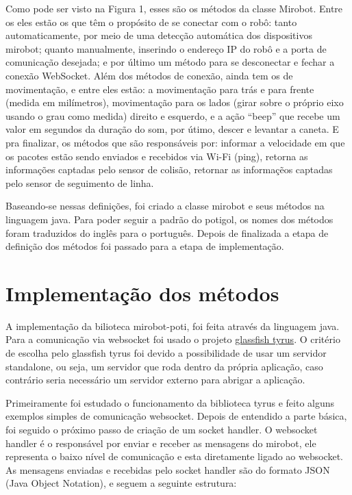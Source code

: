 Como pode ser visto na Figura 1, esses são os métodos da classe Mirobot. Entre
os eles estão os que têm o propósito de se conectar com o robô: tanto
automaticamente, por meio de uma detecção automática dos dispositivos mirobot;
quanto manualmente, inserindo o endereço IP do robô e a porta de comunicação
desejada; e por último um método para se desconectar e fechar a conexão
WebSocket. Além dos métodos de conexão, ainda tem os de movimentação, e entre
eles estão: a movimentação para trás e para frente (medida em milímetros),
movimentação para os lados (girar sobre o próprio eixo usando o grau como
medida) direito e esquerdo, e a ação ``beep'' que recebe um valor em segundos
da duração do som, por útimo, descer e levantar a caneta. E pra finalizar, os
métodos que são responsáveis por: informar a velocidade em que os pacotes estão
sendo enviados e recebidos via Wi-Fi (ping), retorna as informações captadas
pelo sensor de colisão, retornar as informaçẽos captadas pelo sensor de
seguimento de linha.

Baseando-se nessas definições, foi criado a classe mirobot e seus métodos na
linguagem java. Para poder seguir a padrão do potigol, os nomes dos métodos
foram traduzidos do inglês para o português. Depois de finalizada a etapa de
definição dos métodos foi passado para a etapa de implementação. 

\section{Implementação dos métodos}
\label{sec:implementacao}

A implementação da bilioteca mirobot-poti, foi feita através da linguagem java.
Para a comunicação via websocket foi usado o projeto
\href{https://tyrus.java.net/}{glassfish tyrus}. O critério de escolha pelo
glassfish tyrus foi devido a possibilidade de usar um servidor standalone, ou
seja, um servidor que roda dentro da própria aplicação, caso contrário seria
necessário um servidor externo para abrigar a aplicação. 

Primeiramente foi estudado o funcionamento da biblioteca tyrus e feito alguns
exemplos simples de comunicação websocket. Depois de entendido a parte básica,
foi seguido o próximo passo de criação de um socket handler. O websocket
handler é o responsável por enviar e receber as mensagens do mirobot, ele
representa o baixo nível de comunicação e esta diretamente ligado ao websocket.
As mensagens enviadas e recebidas pelo socket handler são do formato JSON (Java
Object Notation), e seguem a seguinte estrutura:

